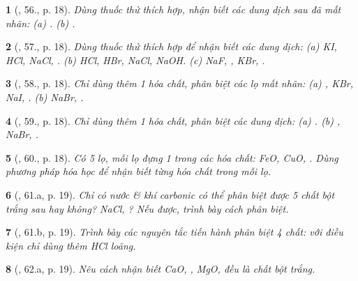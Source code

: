 \documentclass{article}
\newtheorem{baitoan}{}
\begin{document}
\begin{baitoan}[\cite{An_400_BT_Hoa_Hoc_9}, 56., p. 18]
	Dùng thuốc thử thích hợp, nhận biết các dung dịch sau đã mất nhãn: {\rm(a) . (b) }.
\end{baitoan}

\begin{baitoan}[\cite{An_400_BT_Hoa_Hoc_9}, 57., p. 18]
	Dùng thuốc thử thích hợp để nhận biết các dung dịch: {\rm(a) KI, HCl, NaCl, . (b) HCl, HBr, NaCl, NaOH. (c) NaF, , KBr, }.
\end{baitoan}

\begin{baitoan}[\cite{An_400_BT_Hoa_Hoc_9}, 58., p. 18]
	Chỉ dùng thêm 1 hóa chất, phân biệt các lọ mất nhãn: {\rm(a) , KBr, NaI, . (b) NaBr, }.
\end{baitoan}

\begin{baitoan}[\cite{An_400_BT_Hoa_Hoc_9}, 59., p. 18]
	Chỉ dùng thêm 1 hóa chất, phân biệt các dung dịch: {\rm(a) . (b) , NaBr, }.
\end{baitoan}

\begin{baitoan}[\cite{An_400_BT_Hoa_Hoc_9}, 60., p. 18]
	Có 5 lọ, mỗi lọ đựng 1 trong các hóa chất: {\rm FeO, CuO, }. Dùng phương pháp hóa học để nhận biết từng hóa chất trong mỗi lọ.
\end{baitoan}

\begin{baitoan}[\cite{An_400_BT_Hoa_Hoc_9}, 61.a, p. 19]
	Chỉ có nước \& khí carbonic có thể phân biệt được 5 chất bột trắng sau hay không? {\rm NaCl, }? Nếu được, trình bày cách phân biệt.
\end{baitoan}

\begin{baitoan}[\cite{An_400_BT_Hoa_Hoc_9}, 61.b, p. 19]
	Trình bày các nguyên tắc tiến hành phân biệt 4 chất: {\rm{}} với điều kiện chỉ dùng thêm {\rm HCl} loãng.
\end{baitoan}

\begin{baitoan}[\cite{An_400_BT_Hoa_Hoc_9}, 62.a, p. 19]
	Nêu cách nhận biết {\rm CaO, , MgO, } đều là chất bột trắng.
\end{baitoan}
\end{document}
